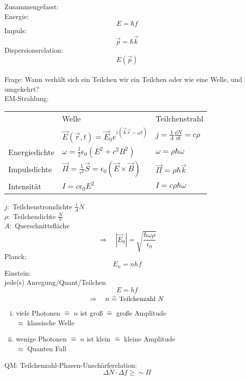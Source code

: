 Zusammengefasst:\\
Energie:
\begin{equation*}
E = \hbar f
\end{equation*}
Impuls:
\begin{equation*}
\vec{p} = \hbar \vec{k}
\end{equation*}
Dispersionsrelation:
\begin{equation*}
E(\vec{p})
\end{equation*}
\\[5pt]
Frage: Wann verhält sich ein Teilchen wir ein Teilchen oder wie eine Welle, und umgekehrt?\\[5pt]
EM-Strahlung:
\begin{tabular}{lll}
	& Welle & Teilchenstrahl\\
	& $ \vec{E}(\vec{r},t) = \vec{E}_0 e^{i(\vec{k} \vec{r} - \omega t)} $ & $ j = \frac{1}{A} \frac{\dd N}{\dd t} = c \rho $\\
	Energiedichte & $ \omega = \frac{1}{2} \epsilon_0 \left(E^2 + c^2 B^2\right) $ & $ \omega = \rho \hbar \omega $\\
	Impulsdichte & $ \vec{\Pi} = \frac{1}{c^2} \vec{S} = \epsilon_0 \left(\vec{E} \times \vec{B}\right) $ & $ \vec{\Pi} = \rho \hbar \vec{k} $\\
	Intensität & $ I = c \epsilon_0 E^2 $ & $ I = c \rho \hbar \omega $
\end{tabular}








$ j : $ Teilchenstromdichte $ \frac{1}{A} \dot{N} $\\
$ \rho : $ Teilchendichte $ \frac{N}{V} $\\
$ A : $ Querschnittsfläche
\begin{equation*}
\Rightarrow \quad |\vec{E}_0| = \sqrt{\frac{\hbar \omega \rho}{\epsilon_0}}
\end{equation*}
Planck:
\begin{equation*}
E_n = n h f
\end{equation*}
Einstein:\\
jede(s) Anregung/Quant/Teilchen
\begin{equation*}
E = hf
\end{equation*}
\begin{equation*}
\Rightarrow \quad n \ \widehat{=} \textrm{ Teilchenzahl } N
\end{equation*}
\begin{enumerate}[i)]
	\item viele Photonen $ \widehat{=} $ $ n $ ist groß $ \widehat{=} $ große Amplitude\\
	$ \approx $ klassische Welle
	\item wenige Photonen $ \widehat{=} $ $ n $ ist klein $ \widehat{=} $ kleine Amplitude\\
	$ \approx $ Quanten Fall
\end{enumerate}
QM: Teilchenzahl-Phasen-Unschärferelation:
\begin{equation*}
\Delta N \cdot \Delta f \ge \sim \Pi
\end{equation*}